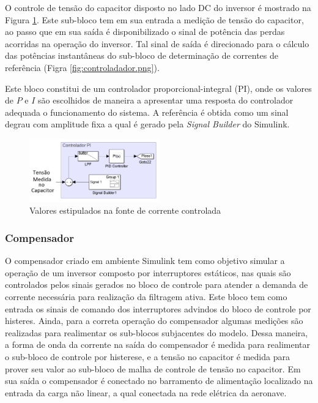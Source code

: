 O controle de tensão do capacitor disposto no lado DC do inversor é mostrado na Figura \ref{fig:PI_sim.png}. Este sub-bloco tem em sua entrada a medição de tensão do capacitor, ao passo que em sua saída é disponibilizado o sinal de potência das perdas acorridas na operação do inversor. Tal sinal de saída é direcionado para o cálculo das potências instantâneas do sub-bloco de determinação de correntes de referência (Figra \ref{fig:controladador.png}).

Este bloco constitui de um controlador proporcional-integral (PI), onde os valores de $P$ e $I$ são escolhidos de maneira a apresentar uma resposta do controlador adequada o funcionamento do sistema. A referência é obtida como um sinal degrau com amplitude fixa a qual é gerado pela \textit{Signal Builder} do Simulink. 

\begin{figure}[!htb] %
	\centering
	\includegraphics[width=0.5\textwidth]{Cap4/Figuras/PI_sim.png}
	\caption{Valores estipulados na fonte de corrente controlada}
	\label{fig:PI_sim.png}
\end{figure}

\subsubsection{Compensador}

O compensador criado em ambiente Simulink tem como objetivo simular a operação de um inversor composto por interruptores estáticos, nas quais são controlados pelos sinais gerados no bloco de controle para atender a demanda de corrente necessária para realização da filtragem ativa. Este bloco tem como entrada os sinais de comando dos interruptores advindos do bloco de controle por histeres. Ainda, para a correta operação do compensador algumas medições são realizadas para realimentar os sub-blocos subjacentes do modelo. Dessa maneira, a forma de onda da corrente na saída do compensador é medida para realimentar o sub-bloco de controle por histerese, e a tensão no capacitor é medida para prover seu valor ao sub-bloco de malha de controle de tensão no capacitor. Em sua saída o compensador é conectado no barramento de alimentação localizado na entrada da carga não linear, a qual conectada na rede elétrica da aeronave.

